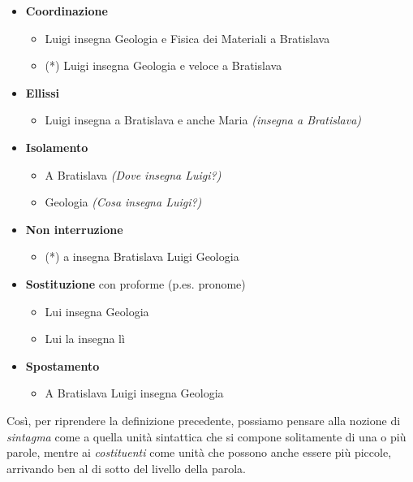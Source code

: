 \documentclass[a4paper,twoside,11pt,chapterprefix=false,bibliography=totocnumbered,listof=flat]{scrbook}
\providecommand{\tightlist}{%
  \setlength{\itemsep}{0pt}\setlength{\parskip}{0pt}}
\begin{document}
\begin{itemize}
\tightlist
\item
  \textbf{Coordinazione}

  \begin{itemize}
  \tightlist
  \item
    Luigi insegna Geologia e Fisica dei Materiali a Bratislava
  \item
    (*) Luigi insegna Geologia e veloce a Bratislava
  \end{itemize}
\item
  \textbf{Ellissi}

  \begin{itemize}
  \tightlist
  \item
    Luigi insegna a Bratislava e anche Maria \emph{(insegna a Bratislava)}
  \end{itemize}
\item
  \textbf{Isolamento}

  \begin{itemize}
  \tightlist
  \item
    A Bratislava \emph{(Dove insegna Luigi?)}
  \item
    Geologia \emph{(Cosa insegna Luigi?)}
  \end{itemize}
\item
  \textbf{Non interruzione}

  \begin{itemize}
  \tightlist
  \item
    (*) a insegna Bratislava Luigi Geologia
  \end{itemize}
\item
  \textbf{Sostituzione} con proforme (p.es. pronome)

  \begin{itemize}
  \tightlist
  \item
    Lui insegna Geologia
  \item
    Lui la insegna lì
  \end{itemize}
\item
  \textbf{Spostamento}

  \begin{itemize}
  \tightlist
  \item
    A Bratislava Luigi insegna Geologia
  \end{itemize}
\end{itemize}

Così, per riprendere la definizione precedente, possiamo pensare alla nozione di \emph{sintagma} come a quella unità sintattica che si compone solitamente di una o più parole, mentre ai \emph{costituenti} come unità che possono anche essere più piccole, arrivando ben al di sotto del livello della parola.
\end{document}
